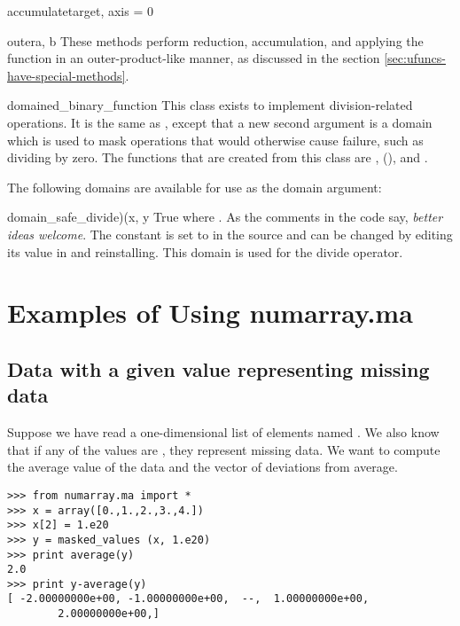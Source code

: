 \begin{methoddesc}{accumulate}{target, axis = 0}
\end{methoddesc}

\begin{methoddesc}{outer}{a, b}
   These methods perform reduction, accumulation, and applying the function in
   an outer-product-like manner, as discussed in the section
   \ref{sec:ufuncs-have-special-methods}.
\end{methoddesc}


\begin{classdesc}{domained_binary_function}{}
   This class exists to implement division-related operations. It is the same
   as , except that a new second argument is a
   domain which is used to mask operations that would otherwise cause failure,
   such as dividing by zero. The functions that are created from this class are
   ,  (), and
   .
\end{classdesc}

The following domains are available for use as the domain argument:

\begin{classdesc}{domain_safe_divide}{)(x, y}
   True where .  As the
   comments in the code say, \emph{better ideas welcome}. The constant
   is set to  in the source and can be changed by editing its
   value in  and reinstalling. This domain is used for the divide
   operator.
\end{classdesc}


\section{Examples of Using numarray.ma}
\label{sec:numarray.ma:examples-using-ma}


\subsection{Data with a given value representing missing data}
\label{sec:numarray.ma:data-with-given-repr-miss-data}

Suppose we have read a one-dimensional list of elements named . We also
know that if any of the values are , they represent missing
data. We want to compute the average value of the data and the vector of
deviations from average.
\begin{verbatim}
>>> from numarray.ma import *
>>> x = array([0.,1.,2.,3.,4.])
>>> x[2] = 1.e20
>>> y = masked_values (x, 1.e20)
>>> print average(y)
2.0
>>> print y-average(y)
[ -2.00000000e+00, -1.00000000e+00,  --,  1.00000000e+00,
        2.00000000e+00,]
\end{verbatim}


